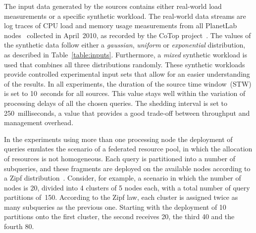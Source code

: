 The input data generated by the sources contains either real-world load measurements or a specific
synthetic workload.
The real-world data streams are log traces of CPU load and memory usage measurements from all PlanetLab
nodes~\cite{planetlab} collected in April~2010, as recorded by the CoTop
project~\cite{cotop}.
The values of the synthetic data follow either a \emph{gaussian}, \emph{uniform} or \emph{exponential}
distribution, as described in Table~\ref{table:inputs}.
Furthermore, a \emph{mixed} synthetic workload is used that combines all three distributions randomly.
These synthetic workloads provide controlled experimental input sets that allow for an easier understanding of the results. 
In all experiments, the duration of the source time window~(STW) is set to 10~seconds for all
sources. This value stays well within the variation of processing delays of all the chosen queries.
The shedding interval is set to 250~milliseconds, a value that provides a good trade-off between
throughput and management overhead.

In the experiments using more than one processing node the deployment of
queries emulates the scenario of a federated resource pool, in which the allocation of resources
is not homogeneous. Each query is partitioned into a number of subqueries, and these fragments are
deployed on the available nodes according to a Zipf distribution~\cite{zipf}. Consider, for example,
a scenario in which the number of nodes is 20, divided into 4 clusters of 5 nodes each, with a total
number of query partitions of~150. According to the Zipf law, each cluster is assigned twice as many
subqueries as the previous one. Starting with the deployment of 10 partitions onto the first cluster, the
second receives 20, the third 40 and the fourth 80. 

% 
%  

